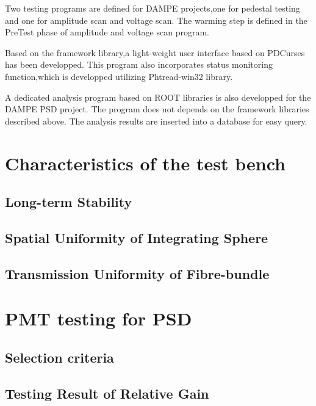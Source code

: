 \documentclass[preprint,5p,times]{elsarticle}
\begin{document}
Two testing programs are defined for DAMPE projects,one for pedestal testing and one for amplitude scan and voltage scan.
The warming step is defined in the PreTest phase of amplitude and voltage scan program.

Based on the framework library,a light-weight user interface based on PDCurses\cite{pdcurses} has been developped.
This program also incorporates status monitoring function,which is developped utilizing Phtread-win32 library\cite{pthread_win32}.

A dedicated analysis program based on ROOT libraries is also developped for the DAMPE PSD project.
The program does not depends on the framework libraries described above.
The analysis results are inserted into a database for easy query.
\section{Characteristics of the test bench}
\label{sec:char_testbench}

\subsection{Long-term Stability}
\label{sec:longterm_stability}

\subsection{Spatial Uniformity of Integrating Sphere}
\label{sec:spatialuniformity_insph}

\subsection{Transmission Uniformity of Fibre-bundle}
\label{sec:transuniformity_fibre}

\section{PMT testing for PSD}
\label{sec:pmt_test}

\subsection{Selection criteria}
\label{sec:selection}

\subsection{Testing Result of Relative Gain}
\label{sec:relative_gain}
\end{document}
